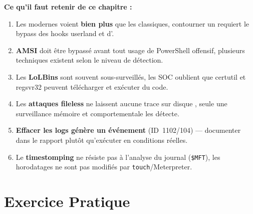 \begin{boxinfo}
\textbf{Ce qu'il faut retenir de ce chapitre :}
\begin{enumerate}
    \item Les  modernes voient \textbf{bien plus} que les 
          classiques, contourner un  requiert le bypass des
          hooks userland et d'.
    \item \textbf{AMSI} doit être bypassé avant tout usage de PowerShell
          offensif, plusieurs techniques existent selon le niveau de
          détection.
    \item Les \textbf{LoLBins} sont souvent sous-surveillés, les SOC
          oublient que certutil et regsvr32 peuvent télécharger et exécuter
          du code.
    \item Les \textbf{attaques fileless} ne laissent aucune trace sur disque
         , seule une surveillance mémoire et comportementale les détecte.
    \item \textbf{Effacer les logs génère un événement} (ID~1102/104) —
          documenter dans le rapport plutôt qu'exécuter en conditions réelles.
    \item Le \textbf{timestomping} ne résiste pas à l'analyse du journal
           (\texttt{\$MFT}), les horodatages 
          ne sont pas modifiés par \texttt{touch}/Meterpreter.
\end{enumerate}
\end{boxinfo}

\section*{Exercice Pratique}

